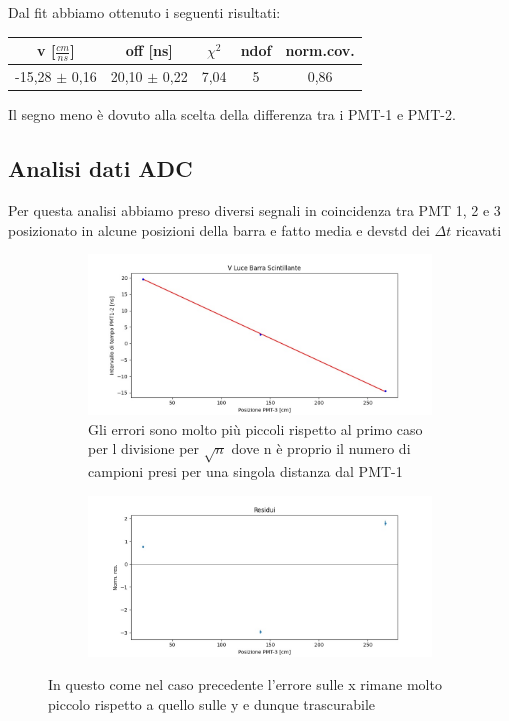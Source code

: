 \documentclass[a4paper]{article}
\begin{document}
Dal fit abbiamo ottenuto i seguenti risultati:

\begin{tabular}{|c|c|c|c|c|}
\hline
v [$\frac{cm}{ns}$] & off [ns] & $\chi ^2$ & ndof & norm.cov. \\
\hline
-15,28 $\pm$ 0,16 & 20,10 $\pm$ 0,22& 7,04 & 5 & 0,86\\
\hline
\end{tabular}

Il segno meno è dovuto alla scelta della differenza tra i PMT-1 e PMT-2.

\subsection{Analisi dati ADC}
Per questa analisi abbiamo preso diversi segnali in coincidenza tra PMT 1, 2 e 3 posizionato in alcune posizioni della barra e fatto media e devstd dei $\Delta t$ ricavati

\begin{figure}[H]
     \begin{subfigure}[b]{0.47\textwidth}
         \centering
         \includegraphics[width=\textwidth]{./immagini/TimeOfFlight/VLightBarraADC}
         \caption{Gli errori sono molto più piccoli rispetto al primo caso per l divisione per $\sqrt{n}$ dove n è proprio il numero di campioni presi per una singola distanza dal PMT-1}
         \label{fig:FitVLightBarraADC}
     \end{subfigure}
     \hfill
     \begin{subfigure}[b]{0.47\textwidth}
         \centering
         \includegraphics[width=\textwidth]{./immagini/TimeOfFlight/ResVLightBarraADC}
         \caption{}
         \label{fig:ResVLIghtBarraADC}
     \end{subfigure}
     \caption{In questo come nel caso precedente l'errore sulle x rimane molto piccolo rispetto a quello sulle y e dunque trascurabile}        
     \label{fig:FitLinVLightBarraADC}
\end{figure}
\end{document}
